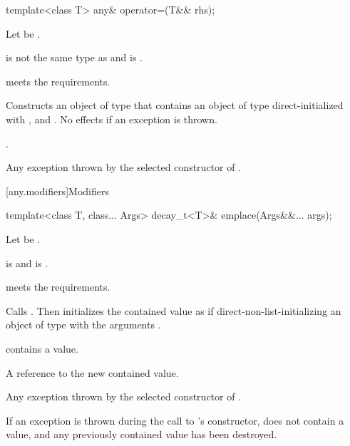 %
\begin{itemdecl}
template<class T>
  any& operator=(T&& rhs);
\end{itemdecl}

\begin{itemdescr}
\pnum
Let  be .

\pnum
\constraints
{} is not the same type as  and
 is .

\pnum
\expects
{} meets the  requirements.

\pnum
\effects
Constructs an object  of type  that contains an object of type  direct-initialized with , and .
No effects if an exception is thrown.

\pnum
\returns
{}.

\pnum
\throws
Any exception thrown by the selected constructor of .
\end{itemdescr}

[any.modifiers]{Modifiers}

%
\begin{itemdecl}
template<class T, class... Args>
  decay_t<T>& emplace(Args&&... args);
\end{itemdecl}

\begin{itemdescr}
\pnum
Let  be .

\pnum
\constraints
{} is  and
 is .

\pnum
\expects
{} meets the  requirements.

\pnum
\effects
Calls .
Then initializes the contained value as if direct-non-list-initializing
an object of type  with the arguments .

\pnum
\ensures
{} contains a value.

\pnum
\returns
A reference to the new contained value.

\pnum
\throws
Any exception thrown by the selected constructor of .

\pnum
\remarks
If an exception is thrown during the call to 's constructor,
 does not contain a value, and any previously contained value
has been destroyed.
\end{itemdescr}

